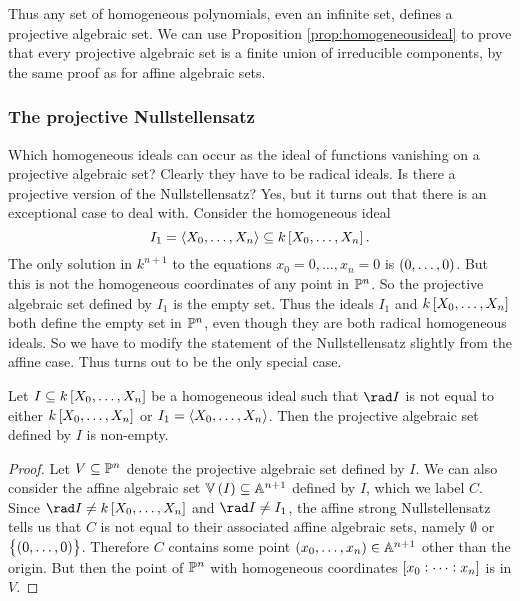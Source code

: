 Thus any set of homogeneous polynomials, even an infinite set, defines a projective algebraic set. We can use Proposition \ref{prop:homogeneousideal} to prove that every projective algebraic set is a finite union of irreducible components, by the same proof as for affine algebraic sets.

\subsubsection{The projective Nullstellensatz}


Which homogeneous ideals can occur as the ideal of functions vanishing on a projective algebraic set? Clearly they have to be radical ideals. Is there a projective version of the Nullstellensatz? Yes, but it turns out that there is an exceptional case to deal with. Consider the homogeneous ideal
$$ I_1 = \abr{X_0, \dots, X_n} \subseteq k\sbr{X_0, \dots, X_n}. $$
The only solution in $ k^{n + 1} $ to the equations $ x_0 = 0, \dots, x_n = 0 $ is $ \br{0, \dots, 0} $. But this is not the homogeneous coordinates of any point in $ \mathbb{P}^n $. So the projective algebraic set defined by $ I_1 $ is the empty set. Thus the ideals $ I_1 $ and $ k\sbr{X_0, \dots, X_n} $ both define the empty set in $ \mathbb{P}^n $, even though they are both radical homogeneous ideals. So we have to modify the statement of the Nullstellensatz slightly from the affine case. Thus turns out to be the only special case.

\pagebreak

\begin{proposition}
Let $ I \subseteq k\sbr{X_0, \dots, X_n} $ be a homogeneous ideal such that $ \rad I $ is not equal to either $ k\sbr{X_0, \dots, X_n} $ or $ I_1 = \left\langle X_0, \dots, X_n \right\rangle $. Then the projective algebraic set defined by $ I $ is non-empty.
\end{proposition}

\begin{proof}
Let $ V \subseteq \mathbb{P}^n $ denote the projective algebraic set defined by $ I $. We can also consider the affine algebraic set $ \VV\br{I} \subseteq \AA^{n + 1} $ defined by $ I $, which we label $ C $. Since $ \rad I \ne k\sbr{X_0, \dots, X_n} $ and $ \rad I \ne I_1 $, the affine strong Nullstellensatz tells us that $ C $ is not equal to their associated affine algebraic sets, namely $ \emptyset $ or $ \cbr{\br{0, \dots, 0}} $. Therefore $ C $ contains some point $ \br{x_0, \dots, x_n} \in \AA^{n + 1} $ other than the origin. But then the point of $ \mathbb{P}^n $ with homogeneous coordinates $ \sbr{x_0 : \dots : x_n} $ is in $ V $.
\end{proof}

